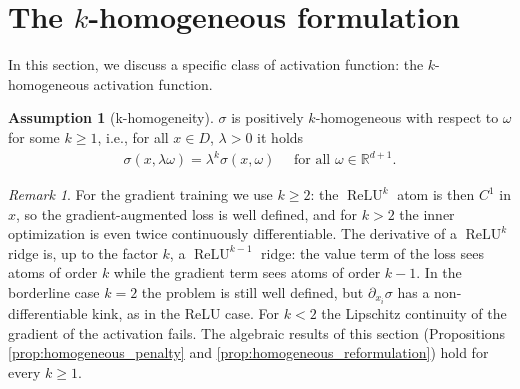 \documentclass[11pt]{amsart}
\theoremstyle{definition}
\newtheorem{assumption}[theorem]{Assumption}
\theoremstyle{remark}
\newtheorem{remark}[theorem]{Remark}
\DeclareMathOperator{\relu}{ReLU}
\newcommand{\reluk}{\relu^{k}}
\begin{document}
\section{The \texorpdfstring{$k$}{k}-homogeneous formulation}
In this section, we discuss a specific class of activation function: the $k$-homogeneous activation function. 

\begin{assumption}[k-homogeneity]
	$\sigma$ is positively $k$-homogeneous with respect to $\omega$ for some $k \ge 1$, i.e., for all $x \in D$, $\lambda > 0$ it holds
\begin{align*}
	\sigma(x, \lambda \omega) = \lambda^k \sigma (x, \omega)\quad \text{ for all } \omega \in \mathbb{R}^{d + 1}.
\end{align*}
\end{assumption}
\begin{remark}
For the gradient training we use $k \ge 2$: the $\reluk$ atom is then $C^1$ in $x$, so the gradient-augmented loss is well defined, and for $k > 2$ the inner optimization is even twice continuously differentiable. The derivative of a $\reluk$ ridge is, up to the factor $k$, a $\relu^{k-1}$ ridge: the value term of the loss sees atoms of order $k$ while the gradient term sees atoms of order $k - 1$. In the borderline case $k = 2$ the problem is still well defined, but $\partial_{x_i} \sigma$ has a non-differentiable kink, as in the ReLU case. For $k < 2$ the Lipschitz continuity of the gradient of the activation fails. The algebraic results of this section (Propositions \ref{prop:homogeneous_penalty} and \ref{prop:homogeneous_reformulation}) hold for every $k \ge 1$.
\end{remark}
\end{document}
